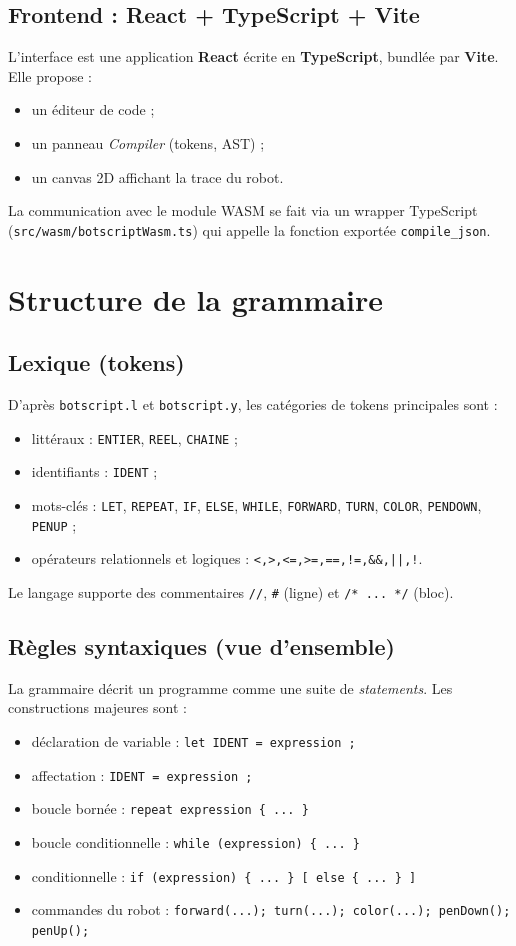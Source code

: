 \documentclass[11pt,a4paper]{article}
\begin{document}
\subsection{Frontend : React + TypeScript + Vite}
L'interface est une application \textbf{React} écrite en \textbf{TypeScript}, bundlée par \textbf{Vite}. Elle propose :
\begin{itemize}
  \item un éditeur de code ;
  \item un panneau \emph{Compiler} (tokens, AST) ;
  \item un canvas 2D affichant la trace du robot.
\end{itemize}
La communication avec le module WASM se fait via un wrapper TypeScript (\texttt{src/wasm/botscriptWasm.ts}) qui appelle la fonction exportée \texttt{compile\_json}.

\section{Structure de la grammaire}
\subsection{Lexique (tokens)}
D'après \texttt{botscript.l} et \texttt{botscript.y}, les catégories de tokens principales sont :
\begin{itemize}
  \item littéraux : \texttt{ENTIER}, \texttt{REEL}, \texttt{CHAINE} ;
  \item identifiants : \texttt{IDENT} ;
  \item mots-clés : \texttt{LET}, \texttt{REPEAT}, \texttt{IF}, \texttt{ELSE}, \texttt{WHILE}, \texttt{FORWARD}, \texttt{TURN}, \texttt{COLOR}, \texttt{PENDOWN}, \texttt{PENUP} ;
  \item opérateurs relationnels et logiques : \texttt{<,>,<=,>=,==,!=,\&\&,||,!}.
\end{itemize}
Le langage supporte des commentaires \texttt{//}, \texttt{\#} (ligne) et \texttt{/* ... */} (bloc).

\subsection{Règles syntaxiques (vue d'ensemble)}
La grammaire décrit un programme comme une suite de \emph{statements}. Les constructions majeures sont :
\begin{itemize}
  \item déclaration de variable : \texttt{let IDENT = expression ;}
  \item affectation : \texttt{IDENT = expression ;}
  \item boucle bornée : \texttt{repeat expression \{ ... \}}
  \item boucle conditionnelle : \texttt{while (expression) \{ ... \}}
  \item conditionnelle : \texttt{if (expression) \{ ... \} [ else \{ ... \} ]}
  \item commandes du robot : \texttt{forward(...); turn(...); color(...); penDown(); penUp();}
\end{itemize}
\end{document}
